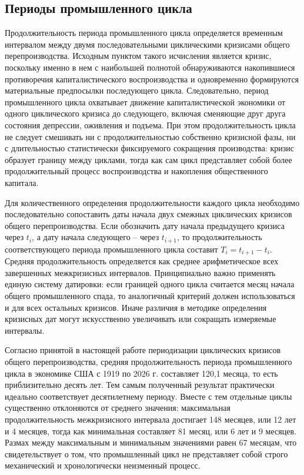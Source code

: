 \subsection{Периоды промышленного цикла}
Продолжительность периода промышленного цикла определяется временным интервалом между двумя последовательными циклическими кризисами общего перепроизводства. Исходным пунктом такого исчисления является кризис, поскольку именно в нем с наибольшей полнотой обнаруживаются накопившиеся противоречия капиталистического воспроизводства и одновременно формируются материальные предпосылки последующего цикла. Следовательно, период промышленного цикла охватывает движение капиталистической экономики от одного циклического кризиса до следующего, включая сменяющие друг друга состояния депрессии, оживления и подъема. При этом продолжительность цикла не следует смешивать ни с продолжительностью собственно кризисной фазы, ни с длительностью статистически фиксируемого сокращения производства: кризис образует границу между циклами, тогда как сам цикл представляет собой более продолжительный процесс воспроизводства и накопления общественного капитала.

Для количественного определения продолжительности каждого цикла необходимо последовательно сопоставить даты начала двух смежных циклических кризисов общего перепроизводства. Если обозначить дату начала предыдущего кризиса через $t_i$, а дату начала следующего – через $t_{i+1}$, то продолжительность соответствующего периода промышленного цикла составит $T_i=t_{i+1}-t_i$. Средняя продолжительность определяется как среднее арифметическое всех завершенных межкризисных интервалов. Принципиально важно применять единую систему датировки: если границей одного цикла считается месяц начала общего промышленного спада, то аналогичный критерий должен использоваться и для всех остальных кризисов. Иначе различия в методике определения кризисных дат могут искусственно увеличивать или сокращать измеряемые интервалы.

Согласно принятой в настоящей работе периодизации циклических кризисов общего перепроизводства, средняя продолжительность периода промышленного цикла в экономике США с 1919 по 2026 г. составляет 120,1 месяца, то есть приблизительно десять лет. Тем самым полученный результат практически идеально соответствует десятилетнему периоду. Вместе с тем отдельные циклы существенно отклоняются от среднего значения: максимальная продолжительность межкризисного интервала достигает 148 месяцев, или 12 лет и 4 месяцев, тогда как минимальная составляет 81 месяц, или 6 лет и 9 месяцев. Размах между максимальным и минимальным значениями равен 67 месяцам, что свидетельствует о том, что промышленный цикл не представляет собой строго механический и хронологически неизменный процесс.

